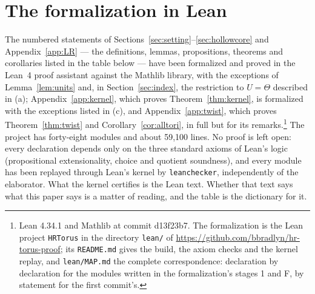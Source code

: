 \section{The formalization in Lean}\label{app:lean}

The numbered statements of Sections~\ref{sec:setting}--\ref{sec:hollowcore} and Appendix~\ref{app:LR} --- the definitions,
lemmas, propositions, theorems and corollaries listed in the table below --- have been formalized and proved in the Lean~4
proof assistant against the Mathlib library, with the exceptions of Lemma~\ref{lem:units} and, in Section~\ref{sec:index}, the restriction to $U=\Theta$ described in (a); Appendix~\ref{app:kernel},
which proves Theorem~\ref{thm:kernel}, is formalized with the exceptions listed in (c), and Appendix~\ref{app:twist}, which proves
Theorem~\ref{thm:twist} and Corollary~\ref{cor:alltori}, in full but for its remarks.\footnote{Lean 4.34.1 and Mathlib
at commit d13f23b7. The formalization is the Lean project \texttt{HRTorus} in the directory \texttt{lean/} of
\url{https://github.com/bbradlyn/hr-torus-proof}; its \texttt{README.md} gives the build, the axiom checks and the kernel
replay, and \texttt{lean/MAP.md} the complete correspondence: declaration by declaration for the modules written in the
formalization's stages 1 and F, by statement for the first commit's.} The project has forty-eight
modules and about 59{,}100 lines. No proof is left open: every declaration depends only on the three standard axioms of
Lean's logic (propositional extensionality, choice and quotient soundness), and every module has been replayed through Lean's
kernel by \texttt{leanchecker}, independently of the elaborator. What the kernel certifies is the Lean text. Whether that text says what this paper says is
a matter of reading, and the table is the dictionary for it.

